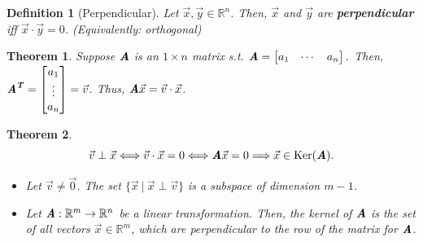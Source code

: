 \documentclass[12pt, a4paper]{article}
\newtheorem{thm}{Theorem}[subsection]
\newtheorem{df}{Definition}[subsection]
\def\R{{\mathbb{R}}}
\def\T{{\textbf{\emph{T}}}}
\def\Ker{\mathrm{Ker}}
\def\vecx{\vec{x}}
\def\vecy{\vec{y}}
\def\vecv{\vec{v}}
\def\matrixA{\textbf{\emph{A}}}
\begin{document}
\begin{df}[Perpendicular]
	Let $\vecx,\vecy\in\R^n$. Then, $\vecx$ and $\vecy$ are \textbf{perpendicular} \emph{iff} $\vecx\cdot\vecy=0$. (Equivalently: orthogonal)	
\end{df}
\begin{thm}
	Suppose $\matrixA$ is an $1\times n$ matrix \emph{s.t.} $\matrixA=\begin{bmatrix}a_1&\cdots&a_n\end{bmatrix}.$ Then, $\matrixA^\T=\begin{bmatrix}a_1\\\vdots\\a_n\end{bmatrix}=\vecv$. Thus, 	$\matrixA\vecx=\vecv\cdot\vecx$.
\end{thm}
\begin{thm}
	\[\vecv\perp\vecx\Longleftrightarrow\vecv\cdot\vecx=0\Longleftrightarrow\matrixA\vecx=0\Longrightarrow\vecx\in\Ker(\matrixA).\]	
	\begin{itemize}
		\item Let $\vecv\neq\vec{0}$. The set $\{\vecx\ |\ \vecx\perp\vecv\}$ is a subspace of dimension $m-1$.
		\item Let $\matrixA: \R^m\to\R^n$ be a linear transformation. Then, the kernel of $\matrixA$ is the set of all vectors $\vecx\in\R^m$, which are perpendicular to the row of the matrix for $\matrixA$.
	\end{itemize}
\end{thm}
\end{document}
